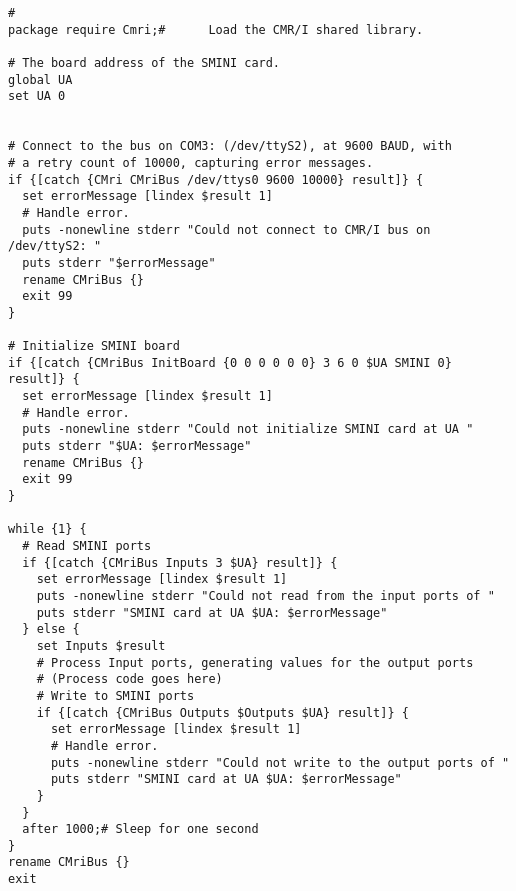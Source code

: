 \begin{lstlisting}[caption={Using the CMR/I from Tcl, more realistic version},
		   label=lst:CMRI:Tcl2]
#
package require Cmri;#		Load the CMR/I shared library.

# The board address of the SMINI card.
global UA
set UA 0


# Connect to the bus on COM3: (/dev/ttyS2), at 9600 BAUD, with
# a retry count of 10000, capturing error messages.
if {[catch {CMri CMriBus /dev/ttys0 9600 10000} result]} {
  set errorMessage [lindex $result 1]
  # Handle error.
  puts -nonewline stderr "Could not connect to CMR/I bus on /dev/ttyS2: "
  puts stderr "$errorMessage"
  rename CMriBus {}
  exit 99
}

# Initialize SMINI board
if {[catch {CMriBus InitBoard {0 0 0 0 0 0} 3 6 0 $UA SMINI 0} result]} {
  set errorMessage [lindex $result 1]
  # Handle error.
  puts -nonewline stderr "Could not initialize SMINI card at UA "
  puts stderr "$UA: $errorMessage"
  rename CMriBus {}
  exit 99
}

while {1} {
  # Read SMINI ports
  if {[catch {CMriBus Inputs 3 $UA} result]} {
    set errorMessage [lindex $result 1]
    puts -nonewline stderr "Could not read from the input ports of "
    puts stderr "SMINI card at UA $UA: $errorMessage"
  } else {
    set Inputs $result
    # Process Input ports, generating values for the output ports
    # (Process code goes here)
    # Write to SMINI ports
    if {[catch {CMriBus Outputs $Outputs $UA} result]} {
      set errorMessage [lindex $result 1]
      # Handle error.
      puts -nonewline stderr "Could not write to the output ports of "
      puts stderr "SMINI card at UA $UA: $errorMessage"
    }
  }
  after 1000;# Sleep for one second
}
rename CMriBus {} 
exit 
\end{lstlisting} 



